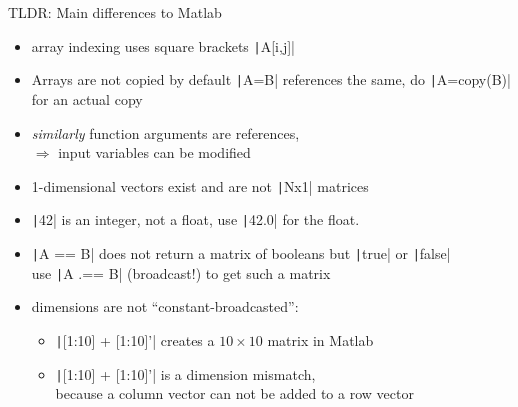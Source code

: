 \documentclass[aspectratio=169, 11pt, handout]{beamer}
\begin{document}
    \begin{frame}[fragile]{TLDR: Main differences to Matlab}
        \begin{itemize}
            \item array indexing uses square brackets \texttt|A[i,j]|
            \pause
            \item Arrays are not copied by default \texttt|A=B| references the same, do \texttt|A=copy(B)| for an actual copy
            \pause
            \item \emph{similarly} function arguments are references,
            \\ \alert{$\Rightarrow$ input variables can be modified}
            \pause
            \item 1-dimensional vectors exist and are not \texttt|Nx1| matrices
            \pause
            \item \texttt|42| is an integer, not a float, use \texttt|42.0| for the float.
            \pause
            \item \texttt|A == B| does not return a matrix of booleans but \texttt|true| or \texttt|false|\\
            use \texttt|A .== B| (broadcast!) to get such a matrix
            \pause
            \item dimensions are not “constant-broadcasted”:\\
            \begin{itemize}
                \item \texttt|[1:10] + [1:10]'| creates a $10\times 10$ matrix in Matlab
                \item \texttt|[1:10] + [1:10]'| is a dimension mismatch,\\
                 because a column vector can not be added to a row vector
            \end{itemize}
        \end{itemize}
    \end{frame}
\end{document}
